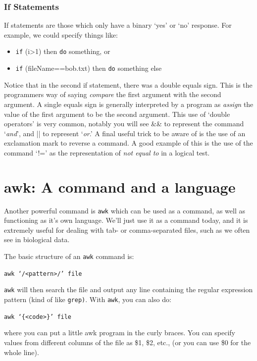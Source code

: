 \documentclass[a4paper,12pt,twoside]{memoir}
\begin{document}
\subsubsection{If Statements}
If statements are those which only have a binary `yes' or `no' response.
For example, we could specify things like:
\begin{itemize}
\item \texttt{if} (i>1) then \texttt{do} something, or
\item \texttt{if} (fileName==bob.txt) then \texttt{do} something else
\end{itemize}

\begin{information}
Notice that in the second if statement, there was a double equals sign.
This is the programmers way of saying \textit{compare} the first argument with the second argument.
A single equals sign is generally interpreted by a program as \textit{assign} the value of the first argument to be the second argument.
This use of `double operators' is very common, notably you will see \&\& to represent the command `\textit{and}', and || to represent `\textit{or}.'
A final useful trick to be aware of is the use of an exclamation mark to reverse a command.
A good example of this is the use of the command `!=' as the representation of \textit{not equal to} in a logical test.
\end{information}

\section{awk: A command and a language}
Another powerful command is \texttt{awk} which can be used as a command, as well as functioning as it's own language.
We'll just use it as a command today, and it is extremely useful for dealing with tab- or comma-separated files, such as we often see in biological data.
\begin{information}
The basic structure of an \texttt{awk} command is: 
\begin{center}
\texttt{awk `/<pattern>/' file} 
\end{center}
\texttt{awk} will then search the file and output any line containing the regular expression pattern (kind of like \texttt{grep)}.
With \texttt{awk}, you can also do: 
\begin{center}
\texttt{awk `\{<code>\}' file} 
\end{center}
where you can put a little awk program in the curly braces. 
You can specify values from different columns of the file as \$1, \$2, etc., (or you can use \$0 for the whole line).
\end{information}
\end{document}
